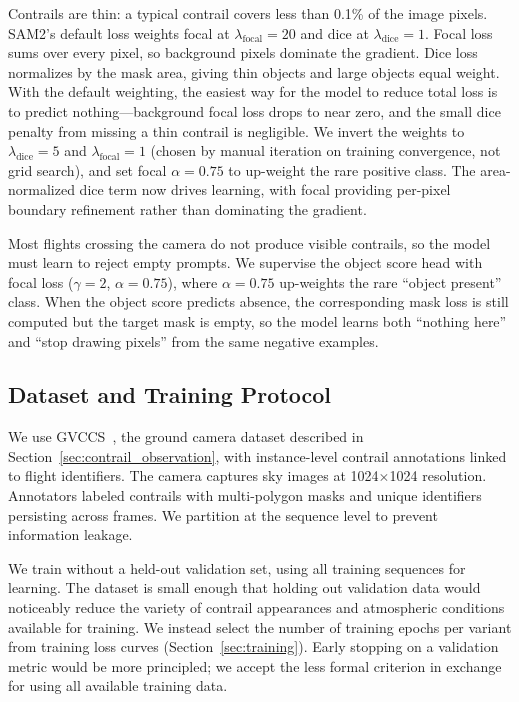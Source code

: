 \documentclass[1p,11pt]{elsarticle}
\begin{document}
Contrails are thin: a typical contrail covers less than 0.1\% of the image pixels. SAM2's default loss weights focal at $\lambda_\text{focal}=20$ and dice at $\lambda_\text{dice}=1$. Focal loss sums over every pixel, so background pixels dominate the gradient. Dice loss normalizes by the mask area, giving thin objects and large objects equal weight. With the default weighting, the easiest way for the model to reduce total loss is to predict nothing---background focal loss drops to near zero, and the small dice penalty from missing a thin contrail is negligible. We invert the weights to $\lambda_\text{dice}=5$ and $\lambda_\text{focal}=1$ (chosen by manual iteration on training convergence, not grid search), and set focal $\alpha=0.75$ to up-weight the rare positive class. The area-normalized dice term now drives learning, with focal providing per-pixel boundary refinement rather than dominating the gradient.

Most flights crossing the camera do not produce visible contrails, so the model must learn to reject empty prompts. We supervise the object score head with focal loss ($\gamma=2$, $\alpha=0.75$), where $\alpha=0.75$ up-weights the rare ``object present'' class. When the object score predicts absence, the corresponding mask loss is still computed but the target mask is empty, so the model learns both ``nothing here'' and ``stop drawing pixels'' from the same negative examples.

\subsection{Dataset and Training Protocol}
\label{sec:dataset}

We use GVCCS~\cite{jarry2025gvccs}, the ground camera dataset described in Section~\ref{sec:contrail_observation}, with instance-level contrail annotations linked to flight identifiers. The camera captures sky images at 1024$\times$1024 resolution. Annotators labeled contrails with multi-polygon masks and unique identifiers persisting across frames. We partition at the sequence level to prevent information leakage.

We train without a held-out validation set, using all training sequences for learning. The dataset is small enough that holding out validation data would noticeably reduce the variety of contrail appearances and atmospheric conditions available for training. We instead select the number of training epochs per variant from training loss curves (Section~\ref{sec:training}). Early stopping on a validation metric would be more principled; we accept the less formal criterion in exchange for using all available training data.
\end{document}
